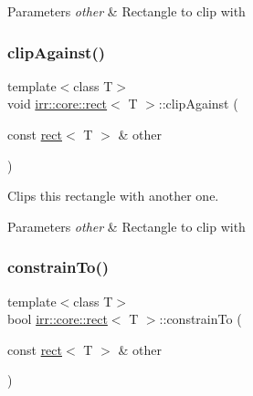 \begin{DoxyParams}{Parameters}
{\em other} & Rectangle to clip with \\
\hline
\end{DoxyParams}
\mbox{\label{classirr_1_1core_1_1rect_a86645d45a8bed1a3539bba9865e93de4}} 
\subsubsection{\texorpdfstring{clip\+Against()}{clipAgainst()}\hspace{0.1cm}{\footnotesize\ttfamily [2/2]}}
{\footnotesize\ttfamily template$<$class T$>$ \\
void \hyperlink{classirr_1_1core_1_1rect}{irr\+::core\+::rect}$<$ T $>$\+::clip\+Against (\begin{DoxyParamCaption}\item[{const \hyperlink{classirr_1_1core_1_1rect}{rect}$<$ T $>$ \&}]{other }\end{DoxyParamCaption})\hspace{0.3cm}{\ttfamily [inline]}}



Clips this rectangle with another one. 


\begin{DoxyParams}{Parameters}
{\em other} & Rectangle to clip with \\
\hline
\end{DoxyParams}
\mbox{\label{classirr_1_1core_1_1rect_a4515d2a1349dc805775854a422465f63}} 
\subsubsection{\texorpdfstring{constrain\+To()}{constrainTo()}\hspace{0.1cm}{\footnotesize\ttfamily [1/2]}}
{\footnotesize\ttfamily template$<$class T$>$ \\
bool \hyperlink{classirr_1_1core_1_1rect}{irr\+::core\+::rect}$<$ T $>$\+::constrain\+To (\begin{DoxyParamCaption}\item[{const \hyperlink{classirr_1_1core_1_1rect}{rect}$<$ T $>$ \&}]{other }\end{DoxyParamCaption})\hspace{0.3cm}{\ttfamily [inline]}}



